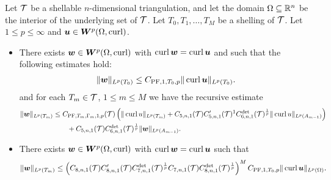 \documentclass[10pt,a4paper]{article}
\begin{document}
\begin{theorem}\label{theorem:poincarefriedrichsestimate:curl}
    Let ${\mathcal T}$ be a shellable $n$-dimensional triangulation, and let the domain $\Omega \subseteq {\mathbb R}^{n}$ be the interior of the underlying set of ${\mathcal T}$.
    Let $T_0, T_1, \dots, T_M$ be a shelling of ${\mathcal T}$.
    Let $1 \leq p \leq \infty$ and $\bm{u} \in \bm{W}^{p}(\Omega,\operatorname{curl})$.
    \begin{itemize}
        \item 
        There exists $\bm{w} \in \bm{W}^{p}(\Omega,\operatorname{curl})$ with $\operatorname{curl} \bm{w} = \operatorname{curl} \bm{u}$
        and such that the following estimates hold:
        \begin{gather*}
            \| \bm{w} \|_{L^{p}(T_{0})} \leq C_{{{\rm PF}},1,T_{0},p} \| \operatorname{curl} \bm{u} \|_{L^{p}(T_{0})}.
        \end{gather*}
        and for each $T_{m} \in {\mathcal T}$, $1 \leq m \leq M$ we have the recursive estimate 
        \begin{align*}
            \| \bm{w} \|_{L^{p}(T_{m})}
            &
            \leq  
            C_{{\rm PF},T_{m},\Gamma_{m},1,p}({\mathcal T}) 
            \left( 
                \| \operatorname{curl} u      \|_{L^{p}(T_{m})} 
                +
                C_{5,n,1}({\mathcal T})
                C'_{5,n,1}({\mathcal T})^{1} 
                C^{\det}_{6,n,1}({\mathcal T})^{\frac 1 p} 
                \| \operatorname{curl} u \|_{L^{p}(A_{m-1})}
            \right)
            \\&\qquad
            + 
            C_{5,n,1}({\mathcal T}) 
            C^{\det}_{6,n,1}({\mathcal T})^{\frac 1 p} 
            \| \bm{w} \|_{L^{p}(A_{m-1})}
            .
        \end{align*}
        \item 
        There exists $\bm{w} \in \bm{W}^{p}(\Omega,\operatorname{curl})$ with $\operatorname{curl} \bm{w} = \operatorname{curl} \bm{u}$ 
        such that 
        \begin{align*}
            \| \bm{w} \|_{L^{p}(T_{m})}
            \leq 
            \left( 
            C_{8,n,1}({\mathcal T})
            C'_{8,n,1}({\mathcal T}) 
            C^{\det}_{7,n,1}({\mathcal T})^{\frac 1 p} 
            C_{7,n,1}({\mathcal T})
            C^{\det}_{8,n,1}({\mathcal T})^{\frac 1 p} 
            \right)^{M}
            C_{{{\rm PF}},1,T_{0},p}
            \| \operatorname{curl} \bm{u} \|_{L^{p}(\Omega)}
            .
        \end{align*}
    \end{itemize}
\end{theorem}
\end{document}
